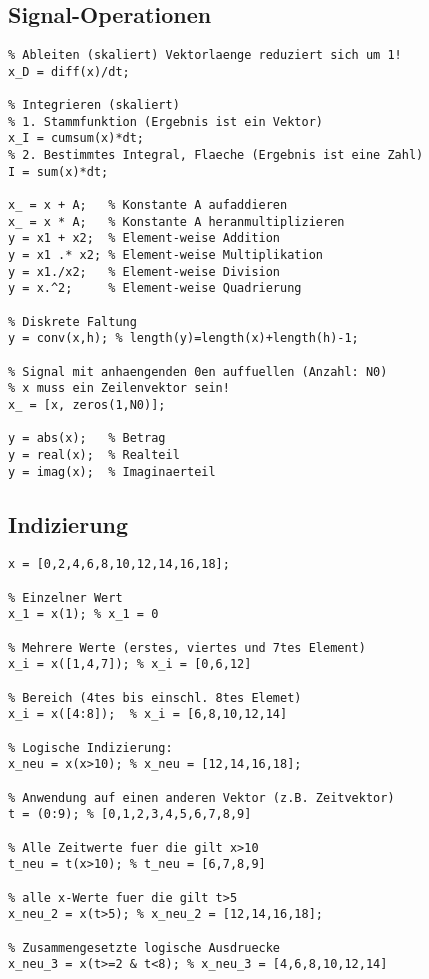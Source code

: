 \documentclass[threecolumn, german]{latex4ei/latex4ei_sheet}
\begin{document}
	\begin{minipage}{\linewidth}
	\begin{sectionbox}
		\subsection{Signal-Operationen}
		\begin{lstlisting}
% Ableiten (skaliert) Vektorlaenge reduziert sich um 1!
x_D = diff(x)/dt;

% Integrieren (skaliert)
% 1. Stammfunktion (Ergebnis ist ein Vektor)
x_I = cumsum(x)*dt;
% 2. Bestimmtes Integral, Flaeche (Ergebnis ist eine Zahl)
I = sum(x)*dt;

x_ = x + A;   % Konstante A aufaddieren
x_ = x * A;   % Konstante A heranmultiplizieren
y = x1 + x2;  % Element-weise Addition
y = x1 .* x2; % Element-weise Multiplikation
y = x1./x2;   % Element-weise Division
y = x.^2;     % Element-weise Quadrierung

% Diskrete Faltung
y = conv(x,h); % length(y)=length(x)+length(h)-1;

% Signal mit anhaengenden 0en auffuellen (Anzahl: N0)
% x muss ein Zeilenvektor sein!
x_ = [x, zeros(1,N0)];

y = abs(x);   % Betrag
y = real(x);  % Realteil
y = imag(x);  % Imaginaerteil
		\end{lstlisting}
	\end{sectionbox}
\end{minipage}
	
	\begin{sectionbox}
		\subsection{Indizierung}
		\begin{lstlisting}
x = [0,2,4,6,8,10,12,14,16,18];

% Einzelner Wert
x_1 = x(1); % x_1 = 0

% Mehrere Werte (erstes, viertes und 7tes Element)
x_i = x([1,4,7]); % x_i = [0,6,12]

% Bereich (4tes bis einschl. 8tes Elemet)
x_i = x([4:8]);  % x_i = [6,8,10,12,14]

% Logische Indizierung:
x_neu = x(x>10); % x_neu = [12,14,16,18];

% Anwendung auf einen anderen Vektor (z.B. Zeitvektor)
t = (0:9); % [0,1,2,3,4,5,6,7,8,9]

% Alle Zeitwerte fuer die gilt x>10
t_neu = t(x>10); % t_neu = [6,7,8,9]

% alle x-Werte fuer die gilt t>5
x_neu_2 = x(t>5); % x_neu_2 = [12,14,16,18];

% Zusammengesetzte logische Ausdruecke
x_neu_3 = x(t>=2 & t<8); % x_neu_3 = [4,6,8,10,12,14]
		\end{lstlisting}
	\end{sectionbox}
	
\end{document}
